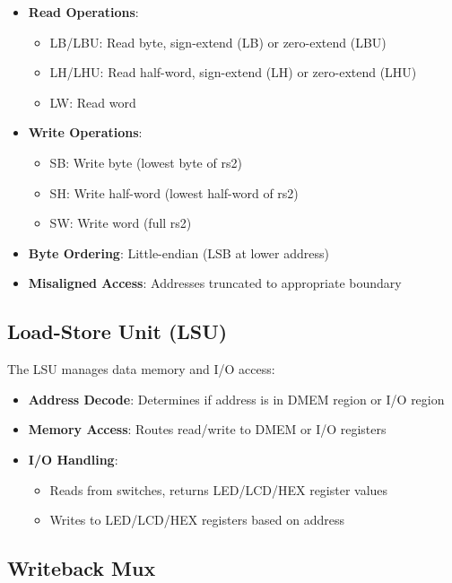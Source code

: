 \begin{itemize}
    \item \textbf{Read Operations}:
    \begin{itemize}
        \item LB/LBU: Read byte, sign-extend (LB) or zero-extend (LBU)
        \item LH/LHU: Read half-word, sign-extend (LH) or zero-extend (LHU)
        \item LW: Read word
    \end{itemize}
    \item \textbf{Write Operations}:
    \begin{itemize}
        \item SB: Write byte (lowest byte of rs2)
        \item SH: Write half-word (lowest half-word of rs2)
        \item SW: Write word (full rs2)
    \end{itemize}
    \item \textbf{Byte Ordering}: Little-endian (LSB at lower address)
    \item \textbf{Misaligned Access}: Addresses truncated to appropriate boundary
\end{itemize}

\subsection{Load-Store Unit (LSU)}

The LSU manages data memory and I/O access:

\begin{itemize}
    \item \textbf{Address Decode}: Determines if address is in DMEM region or I/O region
    \item \textbf{Memory Access}: Routes read/write to DMEM or I/O registers
    \item \textbf{I/O Handling}: 
    \begin{itemize}
        \item Reads from switches, returns LED/LCD/HEX register values
        \item Writes to LED/LCD/HEX registers based on address
    \end{itemize}
\end{itemize}

\subsection{Writeback Mux}

